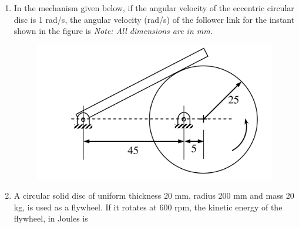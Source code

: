 \documentclass[journal,11pt,onecolumn]{IEEEtran}
\begin{document}
\begin{enumerate}
    \item In the mechanism given below, if the angular velocity of the eccentric circular disc is 1 rad/s, the angular velocity (rad/s) of the follower link for the instant shown in the figure is
          \textit{Note: All dimensions are in mm.}
          \begin{figure}[H]
              \centering
              \includegraphics[scale=0.2]{q20}
              \caption{}
              \label{q20}
          \end{figure}


          \begin{enumerate}
          \end{enumerate}

    \item A circular solid disc of uniform thickness 20 mm, radius 200 mm and mass 20 kg, is used as a flywheel. If it rotates at 600 rpm, the kinetic energy of the flywheel, in Joules is

          \begin{enumerate}
          \end{enumerate}


\end{enumerate}
\end{document}
